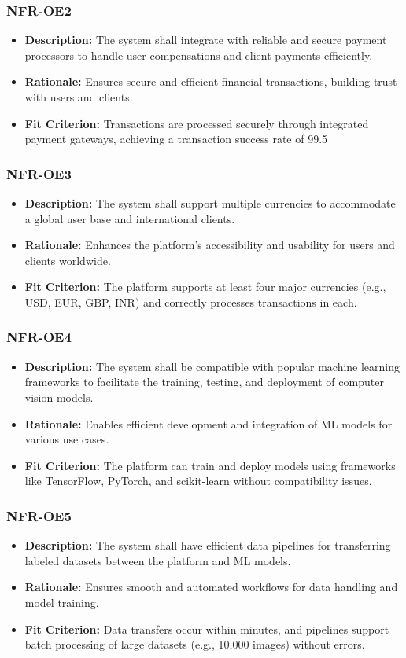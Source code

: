 \documentclass[12pt]{article}
\begin{document}
\subsubsection*{NFR-OE2}
\begin{itemize}
  \item \textbf{Description:} The system shall integrate with reliable and secure payment processors to handle user compensations and client payments efficiently.
  \item \textbf{Rationale:} Ensures secure and efficient financial transactions, building trust with users and clients.
  \item \textbf{Fit Criterion:} Transactions are processed securely through integrated payment gateways, achieving a transaction success rate of 99.5%
\end{itemize}
\subsubsection*{NFR-OE3}
\begin{itemize}
  \item \textbf{Description:} The system shall support multiple currencies to accommodate a global user base and international clients.
  \item \textbf{Rationale:} Enhances the platform’s accessibility and usability for users and clients worldwide.
  \item \textbf{Fit Criterion:} The platform supports at least four major currencies (e.g., USD, EUR, GBP, INR) and correctly processes transactions in each.
\end{itemize}
\subsubsection*{NFR-OE4}
\begin{itemize}
  \item \textbf{Description:} The system shall be compatible with popular machine learning frameworks to facilitate the training, testing, and deployment of computer vision models.
  \item \textbf{Rationale:} Enables efficient development and integration of ML models for various use cases.
  \item \textbf{Fit Criterion:} The platform can train and deploy models using frameworks like TensorFlow, PyTorch, and scikit-learn without compatibility issues.
\end{itemize}
\subsubsection*{NFR-OE5}
\begin{itemize}
  \item \textbf{Description:} The system shall have efficient data pipelines for transferring labeled datasets between the platform and ML models.
  \item \textbf{Rationale:} Ensures smooth and automated workflows for data handling and model training.
  \item \textbf{Fit Criterion:} Data transfers occur within minutes, and pipelines support batch processing of large datasets (e.g., 10,000 images) without errors.
\end{itemize}
\end{document}
